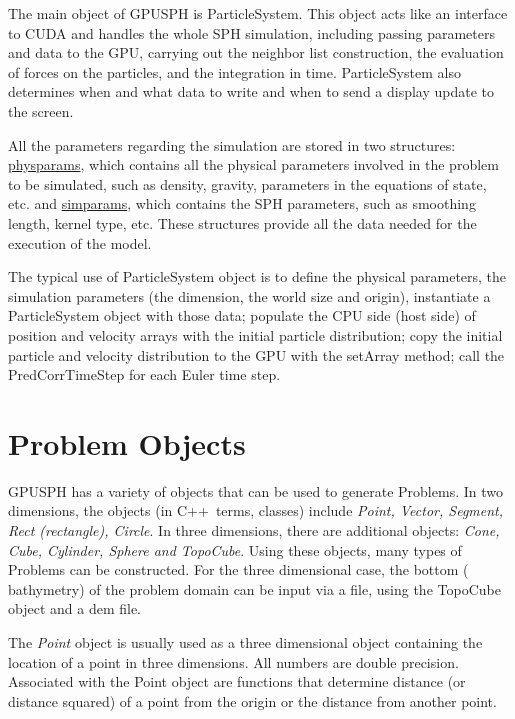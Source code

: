 \documentclass[12pt]{memoir}
\newcommand{\cpp}{{\sffamily C\ttfamily++}}
\begin{document}

The main object of GPUSPH is ParticleSystem. This object acts like an
interface to CUDA and handles the whole SPH simulation, including
passing parameters and data to the GPU, carrying out the neighbor list
construction, the evaluation of forces on the particles, and the
integration in time. ParticleSystem also determines when and what data
to write and when to send a display update to the screen.

All the parameters regarding the simulation are stored in two
structures: \underline{physparams}, which contains all the physical
parameters involved in the problem to be simulated, such as density,
gravity, parameters in the equations of state, etc. and
\underline{simparams}, which contains the SPH parameters, such as
smoothing length, kernel type, etc. These structures provide all the
data needed for the execution of the model.


The typical use of ParticleSystem object is to define the physical
parameters, the simulation parameters (the dimension, the world size and
origin), instantiate a ParticleSystem object with those data; populate
the CPU side (host side) of position and velocity arrays with the
initial particle distribution; copy the initial particle and velocity
distribution to the GPU with the setArray method; call the
PredCorrTimeStep for each Euler time step.


\section{Problem Objects}\label{objects}

GPUSPH has a variety of objects that can be used to generate Problems.
In two dimensions, the objects (in \cpp\ terms, classes) include {\em
Point, Vector, Segment, Rect (rectangle), Circle}. In three
dimensions, there are additional objects: {\em Cone, Cube, Cylinder,
Sphere and TopoCube}. Using these objects, many types of Problems can
be constructed. For the three dimensional case, the bottom (
bathymetry) of the problem domain can be input via a file, using the
TopoCube object and a dem file.

The {\em Point} object is usually used as a three dimensional object
containing the location of a point in three dimensions. All numbers are
double precision. Associated with the Point object are functions that
determine distance (or distance squared) of a point from the origin or
the distance from another point.
\end{document}
